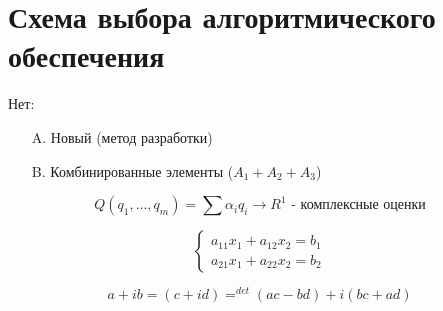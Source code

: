 \documentclass[a4paper, 14pt]{report}
\begin{document}
    \chapter{Схема выбора алгоритмического обеспечения}

    Нет:

    \begin{enumerate}
        \item[A.] Новый (метод разработки)
        \item[B.] Комбинированные элементы ($A_1 + A_2 + A_3$)
    \end{enumerate}

    $$ Q(q_1,...,q_m) = \sum \alpha_i q_i \to R^1 \text{ - комплексные оценки}$$

    $$
    \begin{cases}
        a_{11} x_1 + a_{12} x_2 = b_1 \\
        a_{21} x_1 + a_{22} x_2 = b_2
    \end{cases}
    $$

    $$ a + ib = (c + id) = ^{det} (ac - bd) + i (bc + ad) $$
\end{document}
